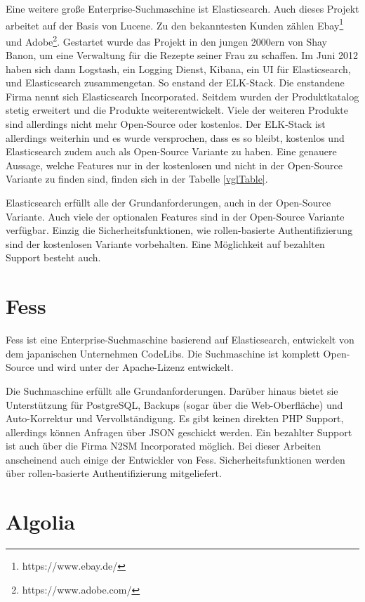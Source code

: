 Eine weitere große Enterprise-Suchmaschine ist Elasticsearch. Auch dieses Projekt arbeitet auf der Basis von Lucene. Zu den bekanntesten Kunden zählen Ebay\footnote{https://www.ebay.de/} und Adobe\footnote{https://www.adobe.com/}. Gestartet wurde das Projekt in den jungen 2000ern von Shay Banon, um eine Verwaltung für die Rezepte seiner Frau zu schaffen. Im Juni 2012 haben sich dann Logstash, ein Logging Dienst, Kibana, ein UI für Elasticsearch, und Elasticsearch zusammengetan. So enstand der ELK-Stack. Die enstandene Firma nennt sich Elasticsearch Incorporated. Seitdem wurden der Produktkatalog stetig erweitert und die Produkte weiterentwickelt. Viele der weiteren Produkte sind allerdings nicht mehr Open-Source oder kostenlos. Der ELK-Stack ist allerdings weiterhin und es wurde versprochen, dass es so bleibt, kostenlos und Elasticsearch zudem auch als Open-Source Variante zu haben. Eine genauere Aussage, welche Features nur in der kostenlosen und nicht in der Open-Source Variante zu finden sind, finden sich in der Tabelle \ref{vglTable}.

Elasticsearch erfüllt alle der Grundanforderungen, auch in der Open-Source Variante. Auch viele der optionalen Features sind in der Open-Source Variante verfügbar. Einzig die Sicherheitsfunktionen, wie rollen-basierte Authentifizierung sind der kostenlosen Variante vorbehalten. Eine Möglichkeit auf bezahlten Support besteht auch. \cite{Elasticsearch.2019}

\section{Fess}
\label{fess}

Fess ist eine Enterprise-Suchmaschine basierend auf Elasticsearch, entwickelt von dem japanischen Unternehmen CodeLibs. Die Suchmaschine ist komplett Open-Source und wird unter der Apache-Lizenz entwickelt.

Die Suchmaschine erfüllt alle Grundanforderungen. Darüber hinaus bietet sie Unterstützung für PostgreSQL, Backups (sogar über die Web-Oberfläche) und Auto-Korrektur und Vervollständigung. Es gibt keinen direkten PHP Support, allerdings können Anfragen über JSON geschickt werden. Ein bezahlter Support ist auch über die Firma N2SM Incorporated \cite{N2SM.2019} möglich. Bei dieser Arbeiten anscheinend auch einige der Entwickler von Fess. Sicherheitsfunktionen werden über rollen-basierte Authentifizierung mitgeliefert. \cite{CodeLibs.2019}

\section{Algolia}
\label{algolia}

